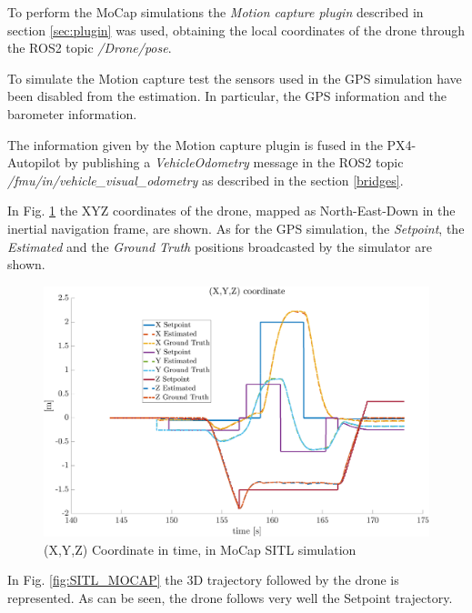 \documentclass[journal]{IEEEtran}
\begin{document}
To perform the MoCap simulations the \textit{Motion capture plugin} described in section \ref{sec:plugin} was used, obtaining the local coordinates of the drone through the ROS2 topic \textit{/Drone/pose}. 

To simulate the Motion capture test the sensors used in the GPS simulation have been disabled from the estimation. In particular, the GPS information and the barometer information.

The information given by the Motion capture plugin is fused in the PX4-Autopilot by publishing a \textit{VehicleOdometry} message in the ROS2 topic \textit{/fmu/in/vehicle\_visual\_odometry} as described in the section \ref{bridges}.

In Fig. \ref{fig:SITL_MOCAP_TIME} the XYZ coordinates of the drone, mapped as North-East-Down in the inertial navigation frame, are shown. As for the GPS simulation, the \textit{Setpoint}, the \textit{Estimated} and the \textit{Ground Truth} positions broadcasted by the simulator are shown.

\begin{figure}
    \centering
    \includegraphics[scale=0.23]{Images/SITL_MOCAP/xyz_sitl_mocap_time.png}
    \caption{(X,Y,Z) Coordinate in time, in MoCap SITL simulation}
    \label{fig:SITL_MOCAP_TIME}
\end{figure}

In Fig. \ref{fig:SITL_MOCAP} the 3D trajectory followed by the drone is represented. As can be seen, the drone follows very well the Setpoint trajectory.
\end{document}
